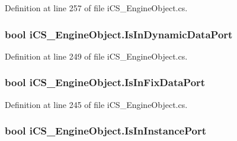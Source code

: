 Definition at line 257 of file i\+C\+S\+\_\+\+Engine\+Object.\+cs.

\hypertarget{classi_c_s___engine_object_a8adca16e4c2c4239c593ed2e6c30fc6c}{
\subsubsection[{Is\+In\+Dynamic\+Data\+Port}]{\setlength{\rightskip}{0pt plus 5cm}bool i\+C\+S\+\_\+\+Engine\+Object.\+Is\+In\+Dynamic\+Data\+Port\hspace{0.3cm}{\ttfamily [get]}}}\label{classi_c_s___engine_object_a8adca16e4c2c4239c593ed2e6c30fc6c}


Definition at line 249 of file i\+C\+S\+\_\+\+Engine\+Object.\+cs.

\hypertarget{classi_c_s___engine_object_a533a545a6478914b5bafdea48e1052e8}{
\subsubsection[{Is\+In\+Fix\+Data\+Port}]{\setlength{\rightskip}{0pt plus 5cm}bool i\+C\+S\+\_\+\+Engine\+Object.\+Is\+In\+Fix\+Data\+Port\hspace{0.3cm}{\ttfamily [get]}}}\label{classi_c_s___engine_object_a533a545a6478914b5bafdea48e1052e8}


Definition at line 245 of file i\+C\+S\+\_\+\+Engine\+Object.\+cs.

\hypertarget{classi_c_s___engine_object_a21a1d00c3671238a9d844abdc58f39d7}{
\subsubsection[{Is\+In\+Instance\+Port}]{\setlength{\rightskip}{0pt plus 5cm}bool i\+C\+S\+\_\+\+Engine\+Object.\+Is\+In\+Instance\+Port\hspace{0.3cm}{\ttfamily [get]}}}\label{classi_c_s___engine_object_a21a1d00c3671238a9d844abdc58f39d7}


